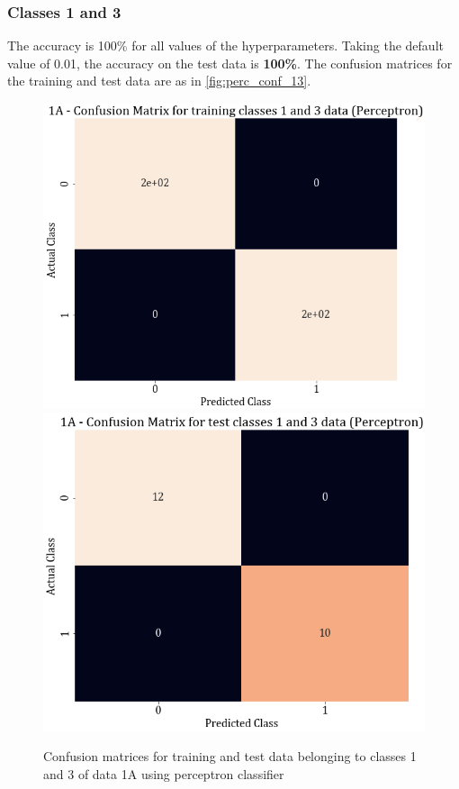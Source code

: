 \documentclass[11pt,a4paper]{article}
\begin{document}
\subsubsection{Classes 1 and 3}

The accuracy is 100\% for all values of the hyperparameters. Taking the default value of 0.01, the accuracy on the test data is \textbf{100\%}. The confusion matrices for the training and test data are as in \autoref{fig:perc_conf_13}.
\begin{figure}[H]
    \centering
    \includegraphics[scale=0.3]{images/1A_perceptron_training_classes_1_and_3_confmat.png}
    \includegraphics[scale=0.3]{images/1A_perceptron_test_classes_1_and_3_confmat.png}
    \caption{Confusion matrices for training and test data belonging to classes 1 and 3 of data 1A using perceptron classifier}
    \label{fig:perc_conf_13}
\end{figure}
\end{document}
